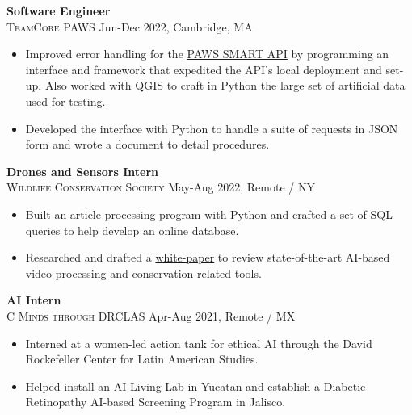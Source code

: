 \documentclass[11pt]{article}
\begin{document}
    \noindent \textbf{Software Engineer}\\
    \textsc{{TeamCore PAWS}} \hfill Jun-Dec 2022, Cambridge, MA
    \begin{itemize}[itemsep=-.4em, leftmargin=1em]\vspace{-2mm}
      \item Improved error handling for the \href{https://github.com/lily-x/paws-smart-api}{PAWS SMART API} by programming an interface and framework that expedited the API's local deployment and set-up. Also worked with QGIS to craft in Python the large set of artificial data used for testing.
      \item Developed the interface with Python to handle a suite of requests in JSON form and wrote a document to detail procedures.
    \end{itemize}
    
    \noindent \textbf{Drones and Sensors Intern}\\
    \textsc{{Wildlife Conservation Society}} \hfill May-Aug 2022, Remote / NY
    \begin{itemize}[itemsep=-.4em, leftmargin=1em]\vspace{-2mm}
      \item Built an article processing program with Python and crafted a set of SQL queries to help develop an online database.
      \item Researched and drafted a 
      \href{https://bit.ly/AI-Advancing-Video-Processing-and-CTDS}{white-paper} to review state-of-the-art AI-based video processing and conservation-related tools.
    \end{itemize}

    \noindent \textbf{AI Intern}\\
    \textsc{{C Minds through DRCLAS}} \hfill Apr-Aug 2021, Remote / MX
    \begin{itemize}[itemsep=-.4em, leftmargin=1em]\vspace{-2mm}
      \item Interned at a women-led action tank for ethical AI through the David Rockefeller Center for Latin American Studies.
      \item Helped install an AI Living Lab in Yucatan and establish a Diabetic Retinopathy AI-based Screening Program in Jalisco. 
    \end{itemize}
\end{document}
